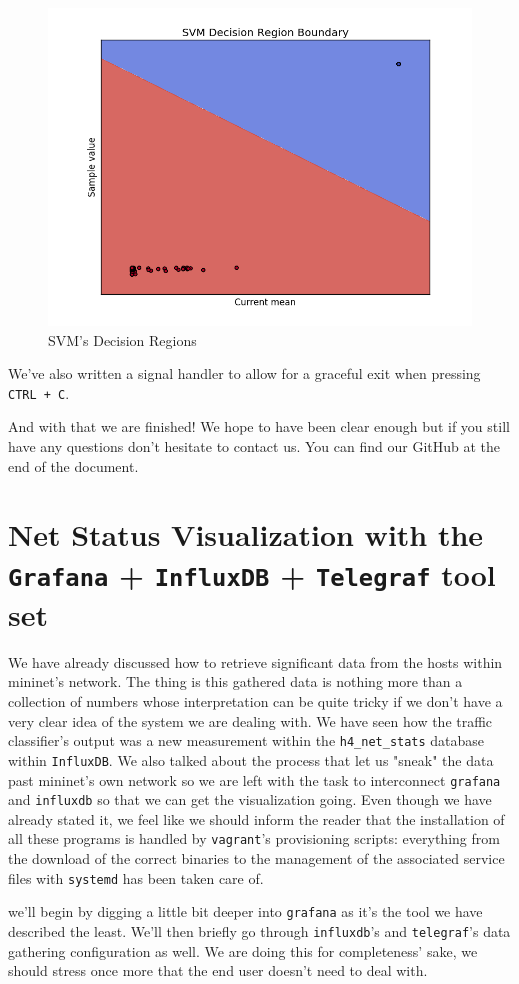 \documentclass[12pt]{article}
\newcommand{\newpar} {
    \vskip 1cm
}
\begin{document}
			\begin{figure}
				\centering
				\includegraphics[width=\linewidth]{svm_graph.png}
				\caption{SVM's Decision Regions}
				\label{f:svm_graph}
			\end{figure}

			We've also written a signal handler to allow for a graceful exit when pressing \texttt{CTRL + C}.
			\newpar
			And with that we are finished! We hope to have been clear enough but if you still have any questions don't hesitate to contact us. You can find our GitHub at the end of the document.

\newpage

\section{Net Status Visualization with the \texttt{Grafana} + \texttt{InfluxDB} + \texttt{Telegraf} tool set}
	We have already discussed how to retrieve significant data from the hosts within mininet's network. The thing is this gathered data is nothing more than a collection of numbers whose interpretation can be quite tricky if we don't have a very clear idea of the system we are dealing with. We have seen how the traffic classifier's output was a new measurement within the \texttt{h4\_net\_stats} database within \texttt{InfluxDB}. We also talked about the process that let us "sneak" the data past mininet's own network so we are left with the task to interconnect \texttt{grafana} and \texttt{influxdb} so that we can get the visualization going. Even though we have already stated it, we feel like we should inform the reader that the installation of all these programs is handled by \texttt{vagrant}'s provisioning scripts: everything from the download of the correct binaries to the management of the associated service files with \texttt{systemd} has been taken care of.
	\newpar
	we'll begin by digging a little bit deeper into \texttt{grafana} as it's the tool we have described the least. We'll then briefly go through \texttt{influxdb}'s and \texttt{telegraf}'s data gathering configuration as well. We are doing this for completeness' sake, we should stress once more that the end user doesn't need to deal with.
\end{document}
